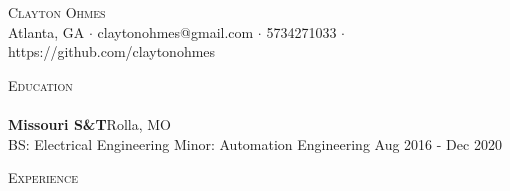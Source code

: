 \documentclass[a4paper]{article}
\newcommand{\lineunder} {
    \vspace*{-8pt} \\
    \hspace*{-18pt} \hrulefill \\
}
\newcommand{\header} [1] {
    {\hspace*{-18pt}\vspace*{6pt} \textsc{#1}}
    \vspace*{-6pt} \lineunder
}
\begin{document}
\vspace*{-40pt}

    

\vspace*{-10pt}
\begin{center}
	{\Huge \scshape {Clayton Ohmes}}\\
	Atlanta, GA $\cdot$ claytonohmes@gmail.com $\cdot$ 5734271033 $\cdot$ https://github.com/claytonohmes\\
\end{center}

\header{Education}
\textbf{Missouri S\&T}\hfill Rolla, MO\\
BS: Electrical Engineering \textbar{} Minor: Automation Engineering \hfill Aug 2016 - Dec 2020\\
\vspace{2mm}

\header{Experience}
\vspace{1mm}
\end{document}
